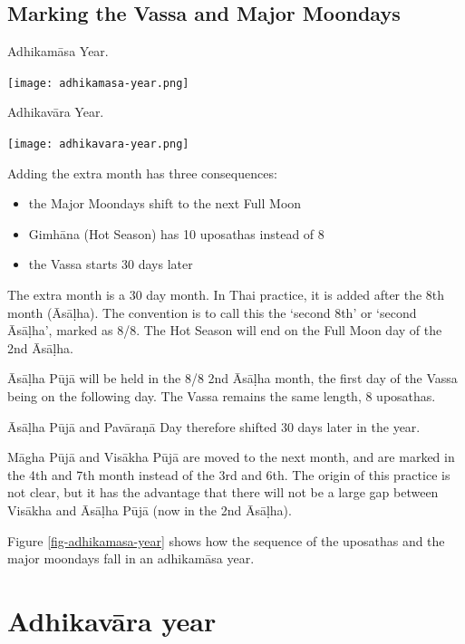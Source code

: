 \documentclass[11pt,oneside]{memoir-article}
\begin{document}
\subsection{Marking the Vassa and Major Moondays}
\label{sec-1-3-1}
\label{marking-the-moondays-adhikamasa-year}

\begin{marginfigure}[-25mm]
\caption{\label{fig-adhikamasa-year} Adhikamāsa Year.}
\texttt{[image: adhikamasa-year.png]}
\end{marginfigure}

\begin{marginfigure}
\caption{\label{fig-adhikavara-year} Adhikavāra Year.}
\texttt{[image: adhikavara-year.png]}
\end{marginfigure}

Adding the extra month has three consequences:

\begin{itemize}
\item the Major Moondays shift to the next Full Moon
\item Gimhāna (Hot Season) has 10 uposathas instead of 8
\item the Vassa starts 30 days later
\end{itemize}

The extra month is a 30 day month. In Thai practice, it is added after the 8th
month (Āsāḷha). The convention is to call this the `second 8th' or `second
Āsāḷha', marked as 8/8. The Hot Season will end on the Full Moon day of the 2nd
Āsāḷha.

Āsāḷha Pūjā will be held in the 8/8 2nd Āsāḷha month, the first day of the
Vassa being on the following day. The Vassa remains the same length, 8 uposathas.

Āsāḷha Pūjā and Pavāraṇā Day therefore shifted 30 days later in the year.

Māgha Pūjā and Visākha Pūjā are moved to the next month, and are marked in the
4th and 7th month instead of the 3rd and 6th. The origin of this practice is not
clear, but it has the advantage that there will not be a large gap between
Visākha and Āsāḷha Pūjā (now in the 2nd Āsāḷha).


Figure \ref{fig-adhikamasa-year} shows how the sequence of the uposathas and the
major moondays fall in an adhikamāsa year.

\section{Adhikavāra year}
\label{sec-1-4}
\end{document}
